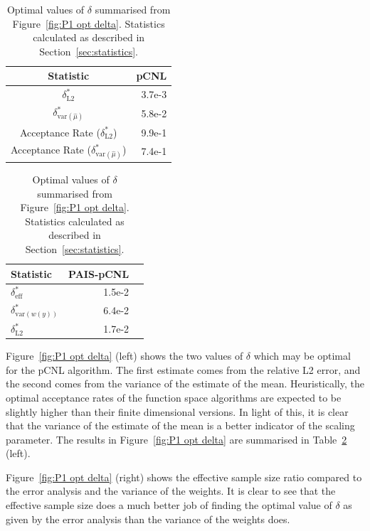 \documentclass[final]{siamltex}
\begin{document}
\begin{table}[!htb]
    \begin{minipage}{.5\linewidth}
      \centering
        \begin{tabular}{|c|r|}
	\hline
	Statistic											& pCNL \\ \hline
	$\delta_{\text{L2}}^*$								& 3.7e-3 \\
	$\delta_{\text{var}(\hat{\mu})}^*$					& 5.8e-2 \\
	Acceptance Rate ($\delta_{\text{L2}}^*$)				& 9.9e-1 \\
	Acceptance Rate ($\delta_{\text{var}(\hat{\mu})}^*$)	& 7.4e-1 \\
	\hline
	\end{tabular}
    \end{minipage}%
    \begin{minipage}{.5\linewidth}
      \centering
        \begin{tabular}{|l|r|r|}
	\hline
	Statistic							& PAIS-pCNL \\ \hline
	$\delta_{\text{eff}}^*$				& 1.5e-2 \\
	$\delta_{\text{var}(w(y))}^*$		& 6.4e-2 \\
	$\delta_{\text{L2}}^*$				& 1.7e-2 \\
	\hline
	\end{tabular}
    \end{minipage}
	\caption{Optimal values of $\delta$ summarised from Figure~\ref{fig:P1 opt delta}. Statistics calculated as described in Section~\ref{sec:statistics}.}
	\label{table:prob1 opt delta}
\end{table}

Figure~\ref{fig:P1 opt delta} (left) shows the two values of $\delta$ which may be optimal for the pCNL algorithm. The first estimate comes from the relative L2 error, and the second comes from the variance of the estimate of the mean. Heuristically, the optimal acceptance rates of the function space algorithms are expected to be slightly higher than their finite dimensional versions. In light of this, it is clear that the variance of the estimate of the mean is a better indicator of the scaling parameter. The results in Figure~\ref{fig:P1 opt delta} are summarised in Table~\ref{table:prob1 opt delta} (left).

Figure~\ref{fig:P1 opt delta} (right) shows the effective sample size ratio compared to the error analysis and the variance of the weights. It is clear to see that the effective sample size does a much better job of finding the optimal value of $\delta$ as given by the error analysis than the variance of the weights does.
\end{document}
